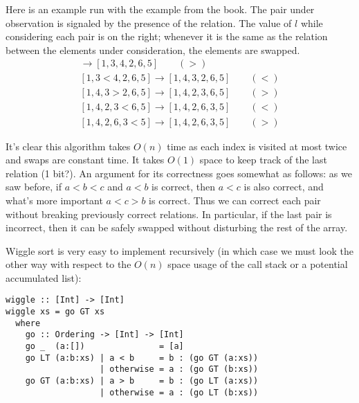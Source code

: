 \documentclass{report}
\begin{document}
Here is an example run with the example from the book. The pair under observation is signaled by the presence of the relation. The value of $l$ while considering each pair is on the right; whenever it is the same as the relation between the elements under consideration, the elements are swapped.
\begin{gather*}
	[3 > 1,4,2,6,5] \to [1,3,4,2,6,5] \qquad (>)\\
	[1,3 < 4,2,6,5] \to [1,4,3,2,6,5] \qquad (<)\\
	[1,4,3 > 2,6,5] \to [1,4,2,3,6,5] \qquad (>)\\
	[1,4,2,3 < 6,5] \to [1,4,2,6,3,5] \qquad (<)\\
	[1,4,2,6,3 < 5] \to [1,4,2,6,3,5] \qquad (>)
\end{gather*}

It's clear this algorithm takes $O(n)$ time as each index is visited at most twice and swaps are constant time. It takes $O(1)$ space to keep track of the last relation (1 bit?). An argument for its correctness goes somewhat as follows: as we saw before, if $a < b < c$ and $a < b$ is correct, then $a < c$ is also correct, and what's more important $a < c > b$ is correct. Thus we can correct each pair without breaking previously correct relations. In particular, if the last pair is incorrect, then it can be safely swapped without disturbing the rest of the array.

\smallskip

Wiggle sort is very easy to implement recursively (in which case we must look the other way with respect to the $O(n)$ space usage of the call stack or a potential accumulated list):
\begin{lstlisting}
wiggle :: [Int] -> [Int]
wiggle xs = go GT xs
  where
    go :: Ordering -> [Int] -> [Int]
    go _  (a:[])               = [a]
    go LT (a:b:xs) | a < b     = b : (go GT (a:xs))
                   | otherwise = a : (go GT (b:xs))
    go GT (a:b:xs) | a > b     = b : (go LT (a:xs))
                   | otherwise = a : (go LT (b:xs))
\end{lstlisting}
\end{document}
